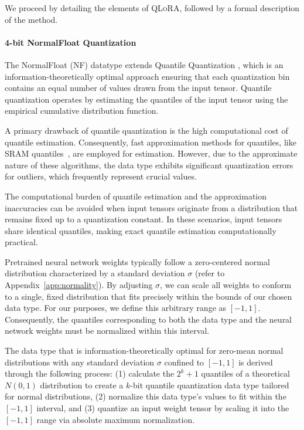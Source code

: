 We proceed by detailing the elements of \textsc{QLoRA}, followed by a formal description of the method.

\paragraph{4-bit NormalFloat Quantization} The NormalFloat (NF) datatype extends Quantile Quantization \citep{dettmers2022optimizers}, which is an information-theoretically optimal approach ensuring that each quantization bin contains an equal number of values drawn from the input tensor. Quantile quantization operates by estimating the quantiles of the input tensor using the empirical cumulative distribution function.

A primary drawback of quantile quantization is the high computational cost of quantile estimation. Consequently, fast approximation methods for quantiles, like SRAM quantiles~\citep{dettmers2022optimizers}, are employed for estimation. However, due to the approximate nature of these algorithms, the data type exhibits significant quantization errors for outliers, which frequently represent crucial values.

The computational burden of quantile estimation and the approximation inaccuracies can be avoided when input tensors originate from a distribution that remains fixed up to a quantization constant. In these scenarios, input tensors share identical quantiles, making exact quantile estimation computationally practical.

Pretrained neural network weights typically follow a zero-centered normal distribution characterized by a standard deviation $\sigma$ (refer to Appendix~\ref{app:normality}). By adjusting $\sigma$, we can scale all weights to conform to a single, fixed distribution that fits precisely within the bounds of our chosen data type. For our purposes, we define this arbitrary range as $[-1, 1]$. Consequently, the quantiles corresponding to both the data type and the neural network weights must be normalized within this interval.

The data type that is information-theoretically optimal for zero-mean normal distributions with any standard deviation $\sigma$ confined to $[-1, 1]$ is derived through the following process: (1) calculate the $2^k+1$ quantiles of a theoretical $N(0, 1)$ distribution to create a $k$-bit quantile quantization data type tailored for normal distributions, (2) normalize this data type’s values to fit within the $[-1, 1]$ interval, and (3) quantize an input weight tensor by scaling it into the $[-1, 1]$ range via absolute maximum normalization.

